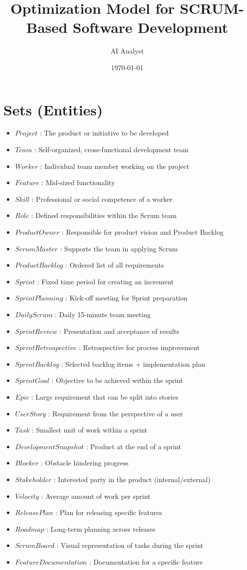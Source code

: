 \documentclass{article}
\title{Optimization Model for SCRUM-Based Software Development}
\author{AI Analyst}
\date{\today}
\begin{document}
\maketitle
\tableofcontents

\section{Sets (Entities)}
\begin{itemize}
    \item $Project$ : The product or initiative to be developed
    \item $Team$ : Self-organized, cross-functional development team
    \item $Worker$ : Individual team member working on the project
    \item $Feature$ : Mid-sized functionality
    \item $Skill$ : Professional or social competence of a worker
    \item $Role$ : Defined responsibilities within the Scrum team
    \item $ProductOwner$ : Responsible for product vision and Product Backlog
    \item $ScrumMaster$ : Supports the team in applying Scrum
    \item $ProductBacklog$ : Ordered list of all requirements
    \item $Sprint$ : Fixed time period for creating an increment
    \item $SprintPlanning$ : Kick-off meeting for Sprint preparation
    \item $DailyScrum$ : Daily 15-minute team meeting
    \item $SprintReview$ : Presentation and acceptance of results
    \item $SprintRetrospective$ : Retrospective for process improvement
    \item $SprintBacklog$ : Selected backlog items + implementation plan
    \item $SprintGoal$ : Objective to be achieved within the sprint
    \item $Epic$ : Large requirement that can be split into stories
    \item $UserStory$ : Requirement from the perspective of a user
    \item $Task$ : Smallest unit of work within a sprint
    \item $DevelopmentSnapshot$ : Product at the end of a sprint
    \item $Blocker$ : Obstacle hindering progress
    \item $Stakeholder$ : Interested party in the product (internal/external)
    \item $Velocity$ : Average amount of work per sprint
    \item $ReleasePlan$ : Plan for releasing specific features
    \item $Roadmap$ : Long-term planning across releases
    \item $ScrumBoard$ : Visual representation of tasks during the sprint
    \item $FeatureDocumentation$ : Documentation for a specific feature
\end{itemize}
\end{document}
